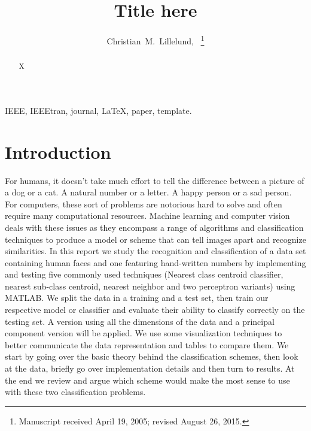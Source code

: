 \documentclass[journal]{IEEEtran}
\begin{document}

\title{Title here}


\author{Christian~M.~Lillelund,~%
\thanks{Manuscript received April 19, 2005; revised August 26, 2015.}}
\maketitle



\begin{abstract}
X
\end{abstract}

\begin{IEEEkeywords}
	IEEE, IEEEtran, journal, \LaTeX, paper, template.
\end{IEEEkeywords}

\section{Introduction}
For humans, it doesn't take much effort to tell the difference between a picture of a dog or a cat. A natural number or a letter. A happy person or a sad person. For computers, these sort of problems are notorious hard to solve and often require many computational resources. Machine learning and computer vision deals with these issues as they encompass a range of algorithms and classification techniques to produce a model or scheme that can tell images apart and recognize similarities. In this report we study the recognition and classification of a data set containing human faces and one featuring hand-written numbers by implementing and testing five commonly used techniques (Nearest class centroid classifier, nearest sub-class centroid, nearest neighbor and two perceptron variants) using MATLAB. We split the data in a training and a test set, then train our respective model or classifier and evaluate their ability to classify correctly on the testing set. A version using all the dimensions of the data and a principal component version will be applied. We use some visualization techniques to better communicate the data representation and tables to compare them. We start by going over the basic theory behind the classification schemes, then look at the data, briefly go over implementation details and then turn to results. At the end we review and argue which scheme would make the most sense to use with these two classification problems.
\end{document}
